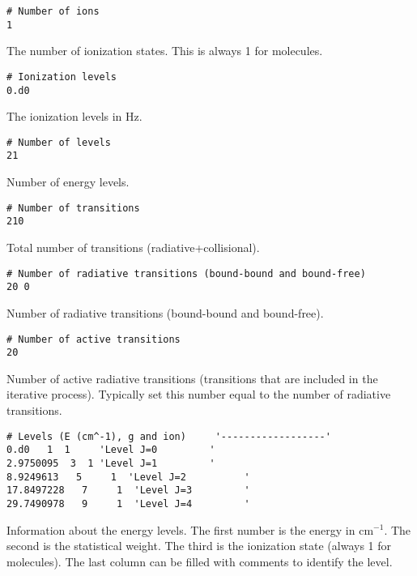 \documentclass[12pt]{article}
\begin{document}
\begin{footnotesize} \begin{verbatim}
# Number of ions
1
\end{verbatim} \end{footnotesize}
The number of ionization states. This is always 1 for molecules.

\begin{footnotesize} \begin{verbatim}
# Ionization levels
0.d0
\end{verbatim} \end{footnotesize}
The ionization levels in Hz.

\begin{footnotesize} \begin{verbatim}
# Number of levels
21
\end{verbatim} \end{footnotesize}
Number of energy levels.

\begin{footnotesize} \begin{verbatim}
# Number of transitions
210
\end{verbatim} \end{footnotesize}
Total number of transitions (radiative+collisional).

\begin{footnotesize} \begin{verbatim}
# Number of radiative transitions (bound-bound and bound-free)
20 0
\end{verbatim} \end{footnotesize}
Number of radiative transitions (bound-bound and bound-free).

\begin{footnotesize} \begin{verbatim}
# Number of active transitions
20
\end{verbatim} \end{footnotesize}
Number of active radiative transitions (transitions that are included
in the iterative process). Typically set this number equal to the number
of radiative transitions.

\begin{footnotesize} \begin{verbatim}
# Levels (E (cm^-1), g and ion)    	'------------------'
0.d0   1  1     'Level J=0         '
2.9750095  3  1 'Level J=1         '
8.9249613   5     1  'Level J=2  		 '
17.8497228   7     1  'Level J=3  		 '
29.7490978   9     1  'Level J=4  		 '
\end{verbatim} \end{footnotesize}
Information about the energy levels. The first number is the energy in cm$^{-1}$. The
second is the statistical weight. The third is the ionization state (always 1 for
molecules). The last column can be filled with comments to identify the level.
\end{document}

